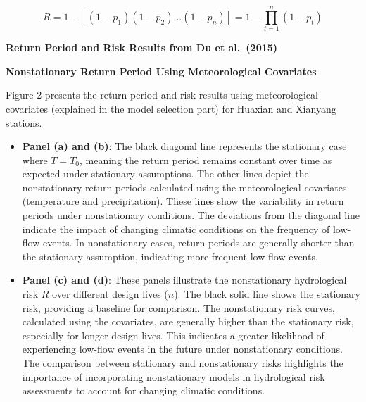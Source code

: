 \documentclass[
]{krantz}
\begin{document}
\[
R=1-\left[\left(1-p_{1}\right)\left(1-p_{2}\right) \ldots\left(1-p_{n}\right)\right]=1-\prod_{t=1}^{n}\left(1-p_{t}\right) \tag{15}
\]

\textbf{Return Period and Risk Results from Du et al.~(2015)}

\textbf{Nonstationary Return Period Using Meteorological Covariates}

Figure 2 presents the return period and risk results using meteorological covariates (explained in the model selection part) for Huaxian and Xianyang stations.

\begin{itemize}
\item
  \textbf{Panel (a) and (b)}: The black diagonal line represents the stationary case where \(T = T_0\), meaning the return period remains constant over time as expected under stationary assumptions. The other lines depict the nonstationary return periods calculated using the meteorological covariates (temperature and precipitation). These lines show the variability in return periods under nonstationary conditions. The deviations from the diagonal line indicate the impact of changing climatic conditions on the frequency of low-flow events. In nonstationary cases, return periods are generally shorter than the stationary assumption, indicating more frequent low-flow events.
\item
  \textbf{Panel (c) and (d)}: These panels illustrate the nonstationary hydrological risk \(R\) over different design lives (\(n\)). The black solid line shows the stationary risk, providing a baseline for comparison. The nonstationary risk curves, calculated using the covariates, are generally higher than the stationary risk, especially for longer design lives. This indicates a greater likelihood of experiencing low-flow events in the future under nonstationary conditions. The comparison between stationary and nonstationary risks highlights the importance of incorporating nonstationary models in hydrological risk assessments to account for changing climatic conditions.
\end{itemize}
\end{document}
